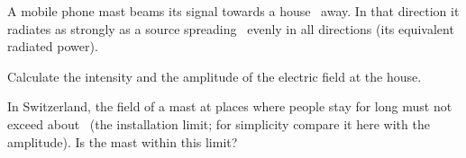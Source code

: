 A mobile phone mast beams its signal towards a house \rO\ away. In that direction it radiates as strongly as a source spreading \PeO\ evenly in all directions (its equivalent radiated power).

\begin{abcliste}
\abc Calculate the intensity and the amplitude of the electric field at the house.

\abc In Switzerland, the field of a mast at places where people stay for long must not exceed about \ElO\ (the installation limit; for simplicity compare it here with the amplitude). Is the mast within this limit?
\end{abcliste}
